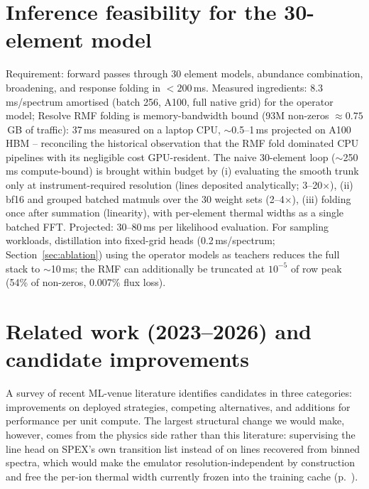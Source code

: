 \documentclass[11pt,a4paper]{article}
\begin{document}
\section{Inference feasibility for the 30-element model}
\label{sec:inference}

Requirement: forward passes through 30 element models, abundance
combination, broadening, and response folding in $<200$\,ms. Measured
ingredients: $8.3$\,ms/spectrum amortised (batch 256, A100, full native
grid) for the operator model; Resolve RMF folding is memory-bandwidth
bound (93M non-zeros $\approx0.75$\,GB of traffic): 37\,ms measured on
a laptop CPU, $\sim$0.5--1\,ms projected on A100 HBM -- reconciling the
historical observation that the RMF fold dominated CPU pipelines with
its negligible cost GPU-resident. The naive 30-element loop
($\sim$250\,ms compute-bound) is brought within budget by (i)
evaluating the smooth trunk only at instrument-required resolution
(lines deposited analytically; 3--20$\times$), (ii) bf16 and grouped
batched matmuls over the 30 weight sets (2--4$\times$), (iii) folding
once after summation (linearity), with per-element thermal widths as a
single batched FFT. Projected: 30--80\,ms per likelihood
evaluation. For sampling workloads, distillation into fixed-grid heads
(0.2\,ms/spectrum; Section~\ref{sec:ablation}) using the operator
models as teachers reduces the full stack to $\sim$10\,ms; the RMF can
additionally be truncated at $10^{-5}$ of row peak (54\% of non-zeros,
0.007\% flux loss).

\section{Related work (2023--2026) and candidate improvements}
\label{sec:related}

A survey of recent ML-venue literature identifies candidates in three
categories: improvements on deployed strategies, competing
alternatives, and additions for performance per unit compute. The
largest structural change we would make, however, comes from the
physics side rather than this literature: supervising the line head on
SPEX's own transition list instead of on lines recovered from binned
spectra, which would make the emulator resolution-independent by
construction and free the per-ion thermal width currently frozen into
the training cache (p.~\pageref{par:linelist}).
\end{document}
